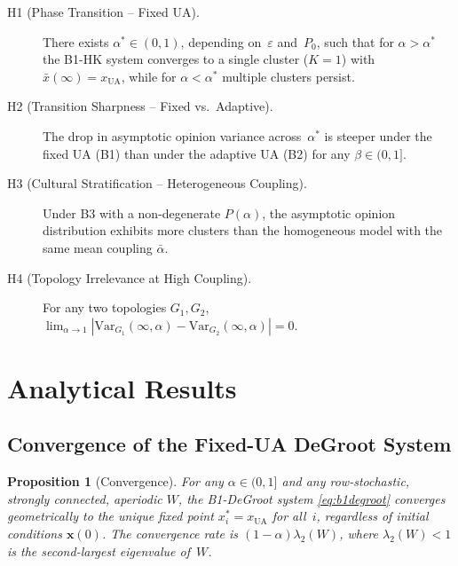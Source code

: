 \documentclass{article}
\theoremstyle{plain}
\newtheorem{proposition}[theorem]{Proposition}
\theoremstyle{definition}
\theoremstyle{remark}
\newcommand{\bx}{\mathbf{x}}
\newcommand{\xUA}{x_{\mathrm{UA}}}
\newcommand{\xbar}{\bar{x}}
\newcommand{\Var}{\mathrm{Var}}
\begin{document}
\begin{description}
\item[H1 (Phase Transition -- Fixed UA).] There exists $\alpha^*\in(0,1)$,
    depending on~$\varepsilon$ and~$P_0$, such that for $\alpha>\alpha^*$
    the B1-HK system converges to a single cluster ($K=1$) with
    $\xbar(\infty)=\xUA$, while for $\alpha<\alpha^*$ multiple clusters
    persist.

\item[H2 (Transition Sharpness -- Fixed vs.\ Adaptive).] The drop in
    asymptotic opinion variance across~$\alpha^*$ is steeper under the
    fixed UA (B1) than under the adaptive UA (B2) for any $\beta\in(0,1]$.

\item[H3 (Cultural Stratification -- Heterogeneous Coupling).] Under B3
    with a non-degenerate $P(\alpha)$, the asymptotic opinion distribution
    exhibits more clusters than the homogeneous model with the same mean
    coupling $\bar\alpha$.

\item[H4 (Topology Irrelevance at High Coupling).] For any two topologies
    $G_1,G_2$,
    $\lim_{\alpha\to 1}|\Var_{G_1}(\infty,\alpha) - \Var_{G_2}(\infty,\alpha)|=0$.
\end{description}

\section{Analytical Results}
\label{sec:analysis}

\subsection{Convergence of the Fixed-UA DeGroot System}

\begin{proposition}[Convergence]
\label{prop:convergence}
For any $\alpha\in(0,1]$ and any row-stochastic, strongly connected,
aperiodic $W$, the B1-DeGroot system \eqref{eq:b1degroot} converges
geometrically to the unique fixed point $x_i^*=\xUA$ for all~$i$,
regardless of initial conditions $\bx(0)$.
The convergence rate is $(1-\alpha)\lambda_2(W)$, where $\lambda_2(W)<1$
is the second-largest eigenvalue of~$W$.
\end{proposition}
\end{document}
